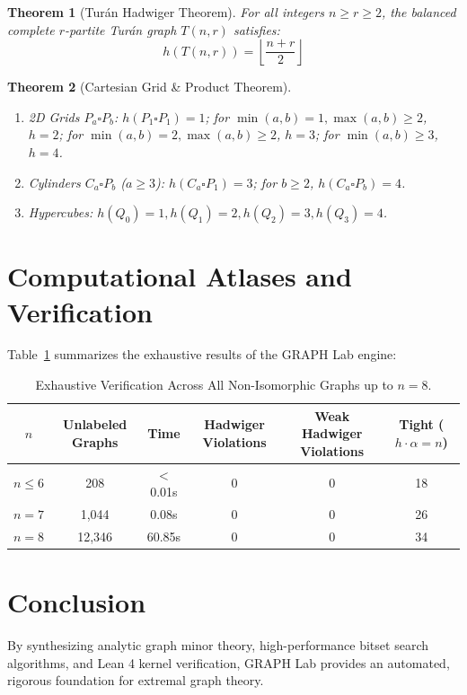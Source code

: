 \documentclass[11pt,a4paper]{article}
\newtheorem{theorem}{Theorem}
\theoremstyle{definition}
\begin{document}
\begin{theorem}[Tur\'an Hadwiger Theorem]
For all integers $n \ge r \ge 2$, the balanced complete $r$-partite Tur\'an graph $T(n, r)$ satisfies:
\[
h(T(n, r)) = \left\lfloor \frac{n + r}{2} \right\rfloor
\]
\end{theorem}

\begin{theorem}[Cartesian Grid \& Product Theorem]
\begin{enumerate}
    \item 2D Grids $P_a \square P_b$: $h(P_1 \square P_1) = 1$; for $\min(a, b)=1, \max(a, b)\ge 2$, $h = 2$; for $\min(a, b)=2, \max(a, b)\ge 2$, $h = 3$; for $\min(a, b)\ge 3$, $h = 4$.
    \item Cylinders $C_a \square P_b$ ($a \ge 3$): $h(C_a \square P_1) = 3$; for $b \ge 2$, $h(C_a \square P_b) = 4$.
    \item Hypercubes: $h(Q_0) = 1, h(Q_1) = 2, h(Q_2) = 3, h(Q_3) = 4$.
\end{enumerate}
\end{theorem}

\section{Computational Atlases and Verification}
Table~\ref{tab:atlas} summarizes the exhaustive results of the GRAPH Lab engine:

\begin{table}[h]
\centering
\begin{tabular}{cccccc}
\toprule
$n$ & Unlabeled Graphs & Time & Hadwiger Violations & Weak Hadwiger Violations & Tight ($h \cdot \alpha = n$) \\
\midrule
$n \le 6$ & 208 & $<$0.01s & 0 & 0 & 18 \\
$n = 7$ & 1,044 & 0.08s & 0 & 0 & 26 \\
$n = 8$ & 12,346 & 60.85s & 0 & 0 & 34 \\
\bottomrule
\end{tabular}
\caption{Exhaustive Verification Across All Non-Isomorphic Graphs up to $n=8$.}
\label{tab:atlas}
\end{table}

\section{Conclusion}
By synthesizing analytic graph minor theory, high-performance bitset search algorithms, and Lean 4 kernel verification, GRAPH Lab provides an automated, rigorous foundation for extremal graph theory.
\end{document}
